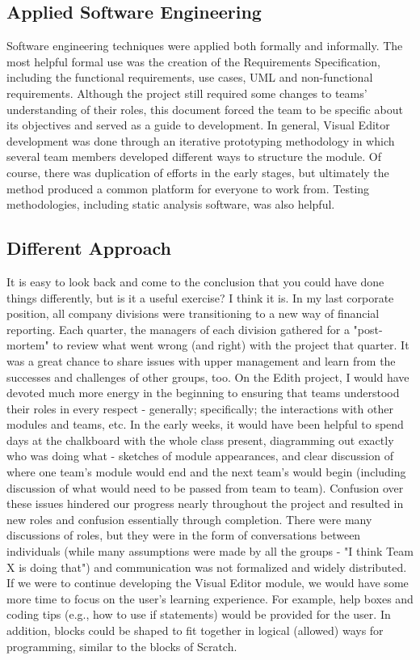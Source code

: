\documentclass[a4paper]{article}
\begin{document}
	\subsection{Applied Software Engineering}
	Software engineering techniques were applied both formally and informally.  The most helpful formal use was the creation of the Requirements Specification, including the functional requirements, use cases, UML and non-functional requirements.  Although the project still required some changes to teams' understanding of their roles, this document forced the team to be specific about its objectives and served as a guide to development.  In general, Visual Editor development was done through an iterative prototyping methodology in which several team members developed different ways to structure the module.  Of course, there was duplication of efforts in the early stages, but ultimately the method produced a common platform for everyone to work from.  Testing methodologies, including static analysis software, was also helpful.  
	        
	
	\subsection{Different Approach}
	It is easy to look back and come to the conclusion that you could have done things differently, but is it a useful exercise?  I think it is.  In my last corporate position, all company divisions were transitioning to a new way of financial reporting.  Each quarter, the managers of each division gathered for a "post-mortem" to review what went wrong (and right) with the project that quarter.  It was a great chance to share issues with upper management and learn from the successes and challenges of other groups, too.  On the Edith project, I would have devoted much more energy in the beginning to ensuring that teams understood their roles in every respect - generally; specifically; the interactions with other modules and teams, etc.  In the early weeks, it would have been helpful to spend days at the chalkboard with the whole class present, diagramming out exactly who was doing what - sketches of module appearances, and clear discussion of where one team's module would end and the next team's would begin (including discussion of what would need to be passed from team to team).  Confusion over these issues hindered our progress nearly throughout the project and resulted in new roles and confusion essentially through completion.  There were many discussions of roles, but they were in the form of conversations between individuals (while many assumptions were made by all the groups - "I think Team X is doing that") and communication was not formalized and widely distributed. If we were to continue developing the Visual Editor module, we would have some more time to focus on the user's learning experience.  For example, help boxes and coding tips (e.g., how to use if statements) would be provided for the user.  In addition, blocks could be shaped to fit together in logical (allowed) ways for programming, similar to the blocks of Scratch.  
	
\end{document}
